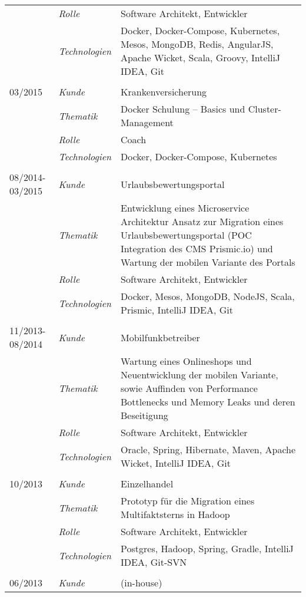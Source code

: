 \begin{longtable}{@{}>{}p{4cm}>{\itshape}p{2cm}>{}p{9cm}}
\nopagebreak		& Rolle 	    & Software Architekt, Entwickler\\
\nopagebreak		& Technologien	& Docker, Docker-Compose, Kubernetes, Mesos, MongoDB, Redis, AngularJS, Apache Wicket, Scala, Groovy, IntelliJ IDEA, Git\\
\\
03/2015             & Kunde 	    & Krankenversicherung\\
\nopagebreak		& Thematik	    & Docker Schulung – Basics und Cluster-Management\\
\nopagebreak		& Rolle 	    & Coach\\
\nopagebreak		& Technologien	& Docker, Docker-Compose, Kubernetes\\
\\
08/2014-03/2015     & Kunde 	    & Urlaubsbewertungsportal\\
\nopagebreak		& Thematik	    & Entwicklung eines Microservice Architektur Ansatz zur Migration eines Urlaubsbewertungsportal (POC Integration des CMS Prismic.io) und Wartung der mobilen Variante des Portals\\
\nopagebreak		& Rolle 	    & Software Architekt, Entwickler\\
\nopagebreak		& Technologien	& Docker, Mesos, MongoDB, NodeJS, Scala, Prismic, IntelliJ IDEA, Git\\
\\
11/2013-08/2014     & Kunde 	    & Mobilfunkbetreiber\\
\nopagebreak		& Thematik	    & Wartung eines Onlineshops und Neuentwicklung der mobilen Variante, sowie Auffinden von Performance Bottlenecks und Memory Leaks und deren Beseitigung\\
\nopagebreak		& Rolle 	    & Software Architekt, Entwickler\\
\nopagebreak		& Technologien	& Oracle, Spring, Hibernate, Maven, Apache Wicket, IntelliJ IDEA, Git\\
\\
10/2013             & Kunde 	    & Einzelhandel\\
\nopagebreak		& Thematik	    & Prototyp für die Migration eines Multifaktsterns in Hadoop\\
\nopagebreak		& Rolle 	    & Software Architekt, Entwickler\\
\nopagebreak		& Technologien	& Postgres, Hadoop, Spring, Gradle, IntelliJ IDEA, Git-SVN\\
\\
06/2013             & Kunde 	    & (in-house)\\

\end{longtable}
